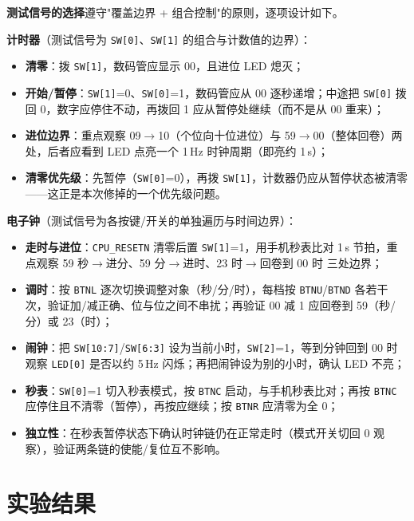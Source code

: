 \documentclass[12pt, a4paper]{ctexart}
\begin{document}
\textbf{测试信号的选择}遵守"覆盖边界 + 组合控制"的原则，逐项设计如下。

\textbf{计时器}（测试信号为 \texttt{SW[0]}、\texttt{SW[1]} 的组合与计数值的边界）：
\begin{itemize}
    \item \textbf{清零}：拨 \texttt{SW[1]}，数码管应显示 00，且进位 LED 熄灭；
    \item \textbf{开始/暂停}：\texttt{SW[1]}=0、\texttt{SW[0]}=1，数码管应从 00 逐秒递增；中途把 \texttt{SW[0]} 拨回 0，数字应停住不动，再拨回 1 应从暂停处继续（而不是从 00 重来）；
    \item \textbf{进位边界}：重点观察 09$\to$10（个位向十位进位）与 59$\to$00（整体回卷）两处，后者应看到 LED 点亮一个 1\,Hz 时钟周期（即亮约 1\,s）；
    \item \textbf{清零优先级}：先暂停（\texttt{SW[0]}=0），再拨 \texttt{SW[1]}，计数器仍应从暂停状态被清零——这正是本次修掉的一个优先级问题。
\end{itemize}

\textbf{电子钟}（测试信号为各按键/开关的单独遍历与时间边界）：
\begin{itemize}
    \item \textbf{走时与进位}：\texttt{CPU\_RESETN} 清零后置 \texttt{SW[1]}=1，用手机秒表比对 1\,s 节拍，重点观察 59 秒$\to$进分、59 分$\to$进时、23 时$\to$回卷到 00 时 三处边界；
    \item \textbf{调时}：按 \texttt{BTNL} 逐次切换调整对象（秒/分/时），每档按 \texttt{BTNU}/\texttt{BTND} 各若干次，验证加/减正确、位与位之间不串扰；再验证 00 减 1 应回卷到 59（秒/分）或 23（时）；
    \item \textbf{闹钟}：把 \texttt{SW[10:7]}/\texttt{SW[6:3]} 设为当前小时，\texttt{SW[2]}=1，等到分钟回到 00 时观察 \texttt{LED[0]} 是否以约 5\,Hz 闪烁；再把闹钟设为别的小时，确认 LED 不亮；
    \item \textbf{秒表}：\texttt{SW[0]}=1 切入秒表模式，按 \texttt{BTNC} 启动，与手机秒表比对；再按 \texttt{BTNC} 应停住且不清零（暂停），再按应继续；按 \texttt{BTNR} 应清零为全 0；
    \item \textbf{独立性}：在秒表暂停状态下确认时钟链仍在正常走时（模式开关切回 0 观察），验证两条链的使能/复位互不影响。
\end{itemize}

\section{实验结果}
\end{document}
